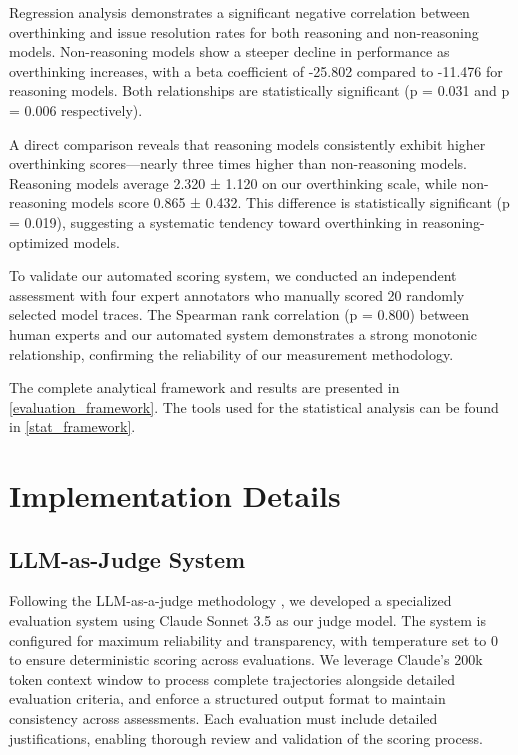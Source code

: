 Regression analysis demonstrates a significant negative correlation between overthinking and issue resolution rates for both reasoning and non-reasoning models. Non-reasoning models show a steeper decline in performance as overthinking increases, with a beta coefficient of -25.802 compared to -11.476 for reasoning models. Both relationships are statistically significant (p = 0.031 and p = 0.006 respectively).

A direct comparison reveals that reasoning models consistently exhibit higher overthinking scores—nearly three times higher than non-reasoning models. Reasoning models average 2.320 ± 1.120 on our overthinking scale, while non-reasoning models score 0.865 ± 0.432. This difference is statistically significant (p = 0.019), suggesting a systematic tendency toward overthinking in reasoning-optimized models.

To validate our automated scoring system, we conducted an independent assessment with four expert annotators who manually scored 20 randomly selected model traces. The Spearman rank correlation (p = 0.800) between human experts and our automated system demonstrates a strong monotonic relationship, confirming the reliability of our measurement methodology.

The complete analytical framework and results are presented in \cref{evaluation_framework}. The tools used for the statistical analysis can be found in \cref{stat_framework}.

\section{Implementation Details}
\label{sec:implementation}

\subsection{LLM-as-Judge System}
Following the LLM-as-a-judge methodology \cite{zheng2023judgingllmasajudgemtbenchchatbot}, we developed a specialized evaluation system using Claude Sonnet 3.5 as our judge model. The system is configured for maximum reliability and transparency, with temperature set to 0 to ensure deterministic scoring across evaluations. We leverage Claude's 200k token context window to process complete trajectories alongside detailed evaluation criteria, and enforce a structured output format to maintain consistency across assessments. Each evaluation must include detailed justifications, enabling thorough review and validation of the scoring process.

